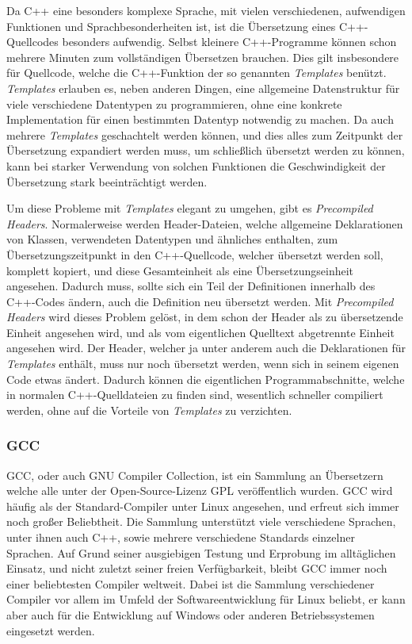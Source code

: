 Da C++ eine besonders komplexe Sprache, mit vielen verschiedenen, aufwendigen Funktionen und Sprachbesonderheiten ist, ist die Übersetzung eines C++-Quellcodes besonders aufwendig. Selbst kleinere
C++-Programme können schon mehrere Minuten zum vollständigen Übersetzen brauchen. Dies gilt insbesondere für Quellcode, welche die C++-Funktion der so genannten \textit{Templates} benützt. \textit{Templates}
erlauben es, neben anderen Dingen, eine allgemeine Datenstruktur für viele verschiedene Datentypen zu programmieren, ohne eine konkrete Implementation für einen bestimmten Datentyp notwendig zu machen.
Da auch mehrere \textit{Templates} geschachtelt werden können, und dies alles zum Zeitpunkt der Übersetzung expandiert werden muss, um schließlich übersetzt werden zu können, kann bei starker Verwendung
von solchen Funktionen die Geschwindigkeit der Übersetzung stark beeinträchtigt werden.

Um diese Probleme mit \textit{Templates} elegant zu umgehen, gibt es \textit{Precompiled Headers}. Normalerweise werden Header-Dateien, welche allgemeine Deklarationen von Klassen, verwendeten Datentypen
und ähnliches enthalten, zum Übersetzungszeitpunkt in den C++-Quellcode, welcher übersetzt werden soll, komplett kopiert, und diese Gesamteinheit als eine Über\-setzungs\-einheit angesehen. Dadurch muss, sollte
sich ein Teil der Definitionen innerhalb des C++-Codes ändern, auch die Definition neu übersetzt werden. Mit \textit{Precompiled Headers} wird dieses Problem gelöst, in dem schon der Header als zu übersetzende
Einheit angesehen wird, und als vom eigentlichen Quelltext abgetrennte Einheit angesehen wird. Der Header, welcher ja unter anderem auch die Deklarationen für \textit{Templates} enthält, muss nur noch
übersetzt werden, wenn sich in seinem eigenen Code etwas ändert. Dadurch können die eigentlichen Programmabschnitte, welche in normalen C++-Quelldateien zu finden sind, wesentlich schneller
compiliert werden, ohne auf die Vorteile von \textit{Templates} zu verzichten.


\subsubsection{GCC}
GCC, oder auch GNU Compiler Collection, ist ein Sammlung an Übersetzern welche alle unter der Open-Source-Lizenz GPL veröffentlich wurden. GCC wird häufig als der Standard-Compiler unter Linux angesehen,
und erfreut sich immer noch großer Beliebtheit. Die Sammlung unterstützt viele verschiedene Sprachen, unter ihnen auch C++, sowie mehrere verschiedene Standards einzelner Sprachen. Auf Grund seiner
ausgiebigen Testung und Erprobung im alltäglichen Einsatz, und nicht zuletzt seiner freien Verfügbarkeit, bleibt GCC immer noch einer beliebtesten Compiler weltweit. Dabei ist die Sammlung verschiedener
Compiler vor allem im Umfeld der Softwareentwicklung für Linux beliebt, er kann aber auch für die Entwicklung auf Windows oder anderen Betriebssystemen eingesetzt werden.

